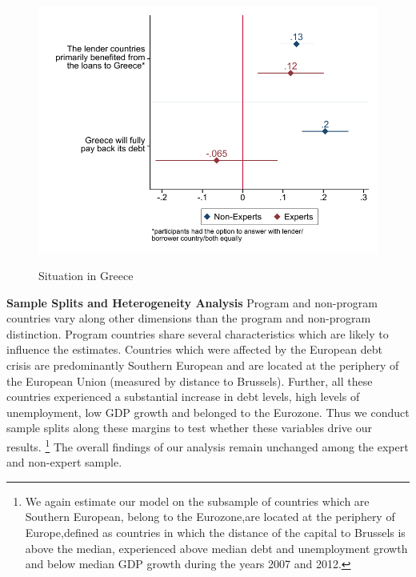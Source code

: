 \begin{figure}[h!] 
\begin{center}
     \caption{Situation in Greece}
     \includegraphics[scale=0.8]{Question6_7_base.pdf}
     \label{fig:my_label}
     \end{center}
     \tiny
\end{figure}
\clearpage
\textbf{Sample Splits and Heterogeneity Analysis}
Program and non-program countries vary along other dimensions than the program and non-program distinction. Program countries share several characteristics which are likely to influence the estimates. Countries which were affected by the European debt crisis are predominantly Southern European and are located at the periphery of the European Union (measured by distance to Brussels). Further, all these countries experienced a substantial increase in debt levels, high levels of unemployment, low GDP growth and belonged to the Eurozone. Thus we conduct sample splits along these margins to test whether these variables drive our results. \footnote{ We again estimate our model on the subsample of countries which are Southern European, belong to the Eurozone,are located at the periphery of Europe,defined as countries in which the distance of the capital to Brussels is above the median, experienced above median debt and unemployment growth and below median GDP growth during the years 2007 and 2012.} The overall findings of our analysis remain unchanged among the expert and non-expert sample.
